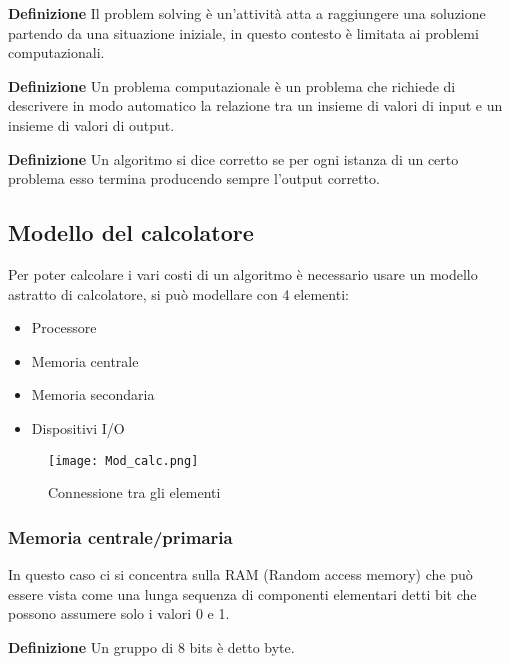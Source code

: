 \documentclass{article}
\begin{document}
\noindent \textbf{Definizione} Il problem solving è un’attività atta a raggiungere una soluzione partendo da una situazione iniziale, in questo contesto è limitata ai problemi computazionali.\newline

\noindent \textbf{Definizione} Un problema computazionale è un problema che richiede di descrivere in modo automatico la relazione tra un insieme di valori di input e un insieme di valori di output.\newline

\noindent \textbf{Definizione} Un algoritmo si dice corretto se per ogni istanza di un certo problema esso termina producendo sempre l'output corretto.\newline

\newpage

\subsection{Modello del calcolatore}

Per poter calcolare i vari costi di un algoritmo è necessario usare un modello astratto di calcolatore, si può modellare con 4 elementi:
\begin{itemize}
    \item Processore
    \item Memoria centrale
    \item Memoria secondaria
    \item Dispositivi I/O
\end{itemize}

\begin{figure}[ht]
    \centering
    \texttt{[image: Mod\_calc.png]}
    \caption{Connessione tra gli elementi}
    \label{fig:enter-label}
\end{figure}

\subsubsection{Memoria centrale/primaria} 

In questo caso ci si concentra sulla RAM (Random access memory) che può essere vista come una lunga sequenza di componenti elementari detti bit che possono assumere solo i valori 0 e 1.\newline

\noindent\textbf{Definizione} Un gruppo di 8 bits è detto byte.\newline
\end{document}
